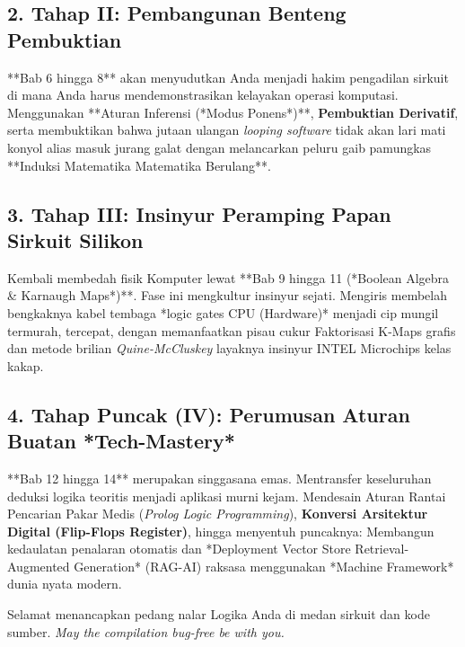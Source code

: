 \subsection{2. Tahap II: Pembangunan Benteng Pembuktian}
**Bab 6 hingga 8** akan menyudutkan Anda menjadi hakim pengadilan sirkuit di mana Anda harus mendemonstrasikan kelayakan operasi komputasi. Menggunakan **Aturan Inferensi (*Modus Ponens*)**, \textbf{Pembuktian Derivatif}, serta membuktikan bahwa jutaan ulangan \textit{looping software} tidak akan lari mati konyol alias masuk jurang galat dengan melancarkan peluru gaib pamungkas **Induksi Matematika Matematika Berulang**.

\subsection{3. Tahap III: Insinyur Peramping Papan Sirkuit Silikon}
Kembali membedah fisik Komputer lewat **Bab 9 hingga 11 (*Boolean Algebra \& Karnaugh Maps*)**. Fase ini mengkultur insinyur sejati. Mengiris membelah bengkaknya kabel tembaga *logic gates CPU (Hardware)* menjadi cip mungil termurah, tercepat, dengan memanfaatkan pisau cukur Faktorisasi K-Maps grafis dan metode brilian \textit{Quine-McCluskey} layaknya insinyur INTEL Microchips kelas kakap.

\subsection{4. Tahap Puncak (IV): Perumusan Aturan Buatan *Tech-Mastery*}
**Bab 12 hingga 14** merupakan singgasana emas. Mentransfer keseluruhan deduksi logika teoritis menjadi aplikasi murni kejam. Mendesain Aturan Rantai Pencarian Pakar Medis (\textit{Prolog Logic Programming}), \textbf{Konversi Arsitektur Digital (Flip-Flops Register)}, hingga menyentuh puncaknya: Membangun kedaulatan penalaran otomatis dan *Deployment Vector Store Retrieval-Augmented Generation* (RAG-AI) raksasa menggunakan *Machine Framework* dunia nyata modern.

Selamat menancapkan pedang nalar Logika Anda di medan sirkuit dan kode sumber. \textit{May the compilation bug-free be with you.}
